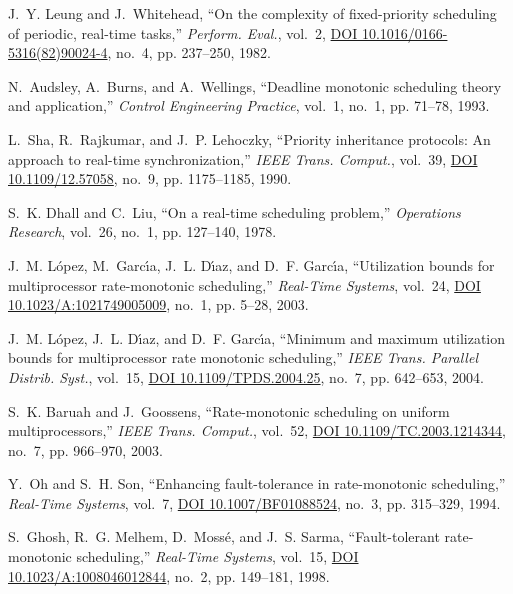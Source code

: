 \documentclass[journal]{IEEEtranTIE}
\begin{document}
\begin{thebibliography}{10}
J.~Y. Leung and J.~Whitehead, ``On the complexity of fixed-priority scheduling
  of periodic, real-time tasks,'' \emph{Perform. Eval.}, vol.~2,
  \href{http://dx.doi.org/10.1016/0166-5316(82)90024-4}{DOI
  10.1016/0166-5316(82)90024-4}, no.~4, pp. 237--250, 1982.

N.~Audsley, A.~Burns, and A.~Wellings, ``Deadline monotonic scheduling theory
  and application,'' \emph{Control Engineering Practice}, vol.~1, no.~1, pp.
  71--78, 1993.

L.~Sha, R.~Rajkumar, and J.~P. Lehoczky, ``Priority inheritance protocols: An
  approach to real-time synchronization,'' \emph{{IEEE} Trans. Comput.},
  vol.~39, \href{http://dx.doi.org/10.1109/12.57058}{DOI 10.1109/12.57058},
  no.~9, pp. 1175--1185, 1990.

S.~K. Dhall and C.~Liu, ``On a real-time scheduling problem,'' \emph{Operations
  Research}, vol.~26, no.~1, pp. 127--140, 1978.

J.~M. L{\'{o}}pez, M.~Garc{\'{\i}}a, J.~L. D{\'{\i}}az, and D.~F.
  Garc{\'{\i}}a, ``Utilization bounds for multiprocessor rate-monotonic
  scheduling,'' \emph{Real-Time Systems}, vol.~24,
  \href{http://dx.doi.org/10.1023/A:1021749005009}{DOI
  10.1023/A:1021749005009}, no.~1, pp. 5--28, 2003.

J.~M. L{\'{o}}pez, J.~L. D{\'{\i}}az, and D.~F. Garc{\'{\i}}a, ``Minimum and
  maximum utilization bounds for multiprocessor rate monotonic scheduling,''
  \emph{{IEEE} Trans. Parallel Distrib. Syst.}, vol.~15,
  \href{http://dx.doi.org/10.1109/TPDS.2004.25}{DOI 10.1109/TPDS.2004.25},
  no.~7, pp. 642--653, 2004.

S.~K. Baruah and J.~Goossens, ``Rate-monotonic scheduling on uniform
  multiprocessors,'' \emph{{IEEE} Trans. Comput.}, vol.~52,
  \href{http://dx.doi.org/10.1109/TC.2003.1214344}{DOI
  10.1109/TC.2003.1214344}, no.~7, pp. 966--970, 2003.

Y.~Oh and S.~H. Son, ``Enhancing fault-tolerance in rate-monotonic
  scheduling,'' \emph{Real-Time Systems}, vol.~7,
  \href{http://dx.doi.org/10.1007/BF01088524}{DOI 10.1007/BF01088524}, no.~3,
  pp. 315--329, 1994.

S.~Ghosh, R.~G. Melhem, D.~Moss{\'{e}}, and J.~S. Sarma, ``Fault-tolerant
  rate-monotonic scheduling,'' \emph{Real-Time Systems}, vol.~15,
  \href{http://dx.doi.org/10.1023/A:1008046012844}{DOI
  10.1023/A:1008046012844}, no.~2, pp. 149--181, 1998.


\end{thebibliography}
\end{document}
